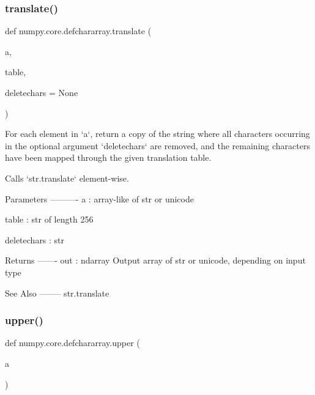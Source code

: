 \subsubsection{\texorpdfstring{translate()}{translate()}}
{\footnotesize\ttfamily def numpy.\+core.\+defchararray.\+translate (\begin{DoxyParamCaption}\item[{}]{a,  }\item[{}]{table,  }\item[{}]{deletechars = {\ttfamily None} }\end{DoxyParamCaption})}

\begin{DoxyVerb}For each element in `a`, return a copy of the string where all
characters occurring in the optional argument `deletechars` are
removed, and the remaining characters have been mapped through the
given translation table.

Calls `str.translate` element-wise.

Parameters
----------
a : array-like of str or unicode

table : str of length 256

deletechars : str

Returns
-------
out : ndarray
    Output array of str or unicode, depending on input type

See Also
--------
str.translate\end{DoxyVerb}
 \mbox{\label{namespacenumpy_1_1core_1_1defchararray_afb7414dad44f9274628b24601c47f06e}} 
\subsubsection{\texorpdfstring{upper()}{upper()}}
{\footnotesize\ttfamily def numpy.\+core.\+defchararray.\+upper (\begin{DoxyParamCaption}\item[{}]{a }\end{DoxyParamCaption})}

